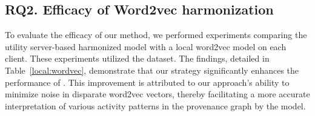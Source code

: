  \subsection*{RQ2. Efficacy of Word2vec harmonization}
 To evaluate the efficacy of our method, we performed experiments comparing the utility server-based harmonized model with a local word2vec model on each client. These experiments utilized the \optc dataset. The findings, detailed in Table~\ref{local:wordvec}, demonstrate that our strategy significantly enhances the performance of \Sys. This improvement is attributed to our approach's ability to minimize noise in disparate word2vec vectors, thereby facilitating a more accurate interpretation of various activity patterns in the provenance graph by the \gnnshort model.





